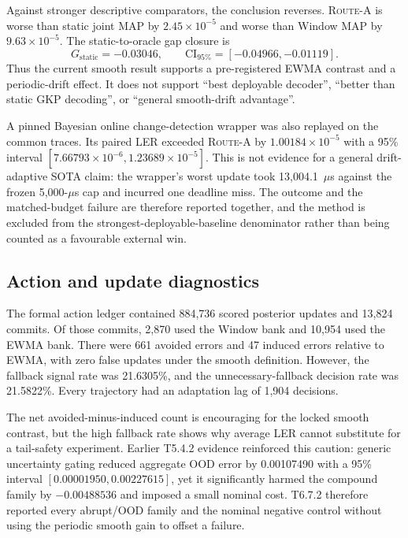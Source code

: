 \documentclass[11pt]{article}
\newcommand{\RouteA}{\textsc{Route-A}}
\begin{document}
Against stronger descriptive comparators, the conclusion reverses.  \RouteA{}
is worse than static joint MAP by $2.45\times10^{-5}$ and worse than Window MAP
by $9.63\times10^{-5}$.  The static-to-oracle gap closure is
\begin{equation}
  G_{\mathrm{static}}=-0.03046,\qquad
  \mathrm{CI}_{95\%}=[-0.04966,-0.01119].
\end{equation}
Thus the current smooth result supports a pre-registered EWMA contrast and a
periodic-drift effect.  It does not support ``best deployable decoder'',
``better than static GKP decoding'', or ``general smooth-drift advantage''.

A pinned Bayesian online change-detection wrapper was also replayed on the
common traces.  Its paired LER exceeded \RouteA{} by
$1.00184\times10^{-5}$ with a 95\% interval
$[7.66793\times10^{-6},1.23689\times10^{-5}]$.  This is not evidence for a
general drift-adaptive SOTA claim: the wrapper's worst update took
13,004.1~$\mu$s against the frozen 5,000-$\mu$s cap and incurred one deadline
miss.  The outcome and the matched-budget failure are therefore reported
together, and the method is excluded from the strongest-deployable-baseline
denominator rather than being counted as a favourable external win.

\subsection{Action and update diagnostics}

The formal action ledger contained 884,736 scored posterior updates and 13,824
commits.  Of those commits, 2,870 used the Window bank and 10,954 used the EWMA
bank.  There were 661 avoided errors and 47 induced errors relative to EWMA,
with zero false updates under the smooth definition.  However, the fallback
signal rate was 21.6305\%, and the unnecessary-fallback decision rate was
21.5822\%.  Every trajectory had an adaptation lag of 1,904 decisions.

The net avoided-minus-induced count is encouraging for the locked smooth
contrast, but the high fallback rate shows why average LER cannot substitute
for a tail-safety experiment.  Earlier T5.4.2 evidence reinforced this caution:
generic uncertainty gating reduced aggregate OOD error by 0.00107490 with a
95\% interval $[0.00001950,0.00227615]$, yet it significantly harmed the
compound family by $-0.00488536$ and imposed a small nominal cost.  T6.7.2
therefore reported every abrupt/OOD family and the nominal negative control
without using the periodic smooth gain to offset a failure.
\end{document}
